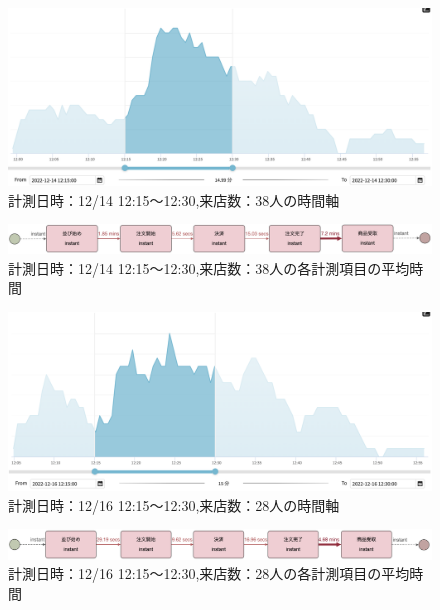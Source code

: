 \documentclass{jsarticle}
\begin{document}
\begin{figure}[H]
  \centering
  \includegraphics[width=15cm]{1214a.png}
  \caption{計測日時：12/14 12:15〜12:30,来店数：38人の時間軸}
  \label{fig:1214a}
\end{figure}
\begin{figure}[H]
  \centering
  \includegraphics[width=15cm]{1214b.png}
  \caption{計測日時：12/14 12:15〜12:30,来店数：38人の各計測項目の平均時間}
  \label{fig:1214b}
\end{figure}


\begin{figure}[H]
  \centering
  \includegraphics[width=15cm]{1216a.png}
  \caption{計測日時：12/16 12:15〜12:30,来店数：28人の時間軸}
  \label{fig:1216a}
\end{figure}
\begin{figure}[H]
  \centering
  \includegraphics[width=15cm]{1216b.png}
  \caption{計測日時：12/16 12:15〜12:30,来店数：28人の各計測項目の平均時間}
  \label{fig:1216b}
\end{figure}

\end{document}
